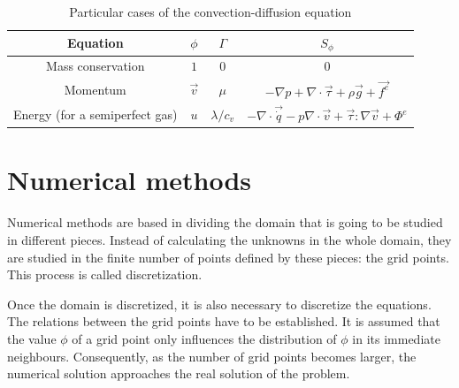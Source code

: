 \begin{table}[h!]
	\centering
	\begin{tabular}{ |c|c|c|c| } 
		\hline
		Equation & $\phi$ & $\Gamma$ & $S_{\phi}$ \\ \hline 
		Mass conservation & $1$ & $0$ & $0$ \\  \hline
		Momentum & $\vec{v}$ & $\mu$ & $-\nabla p+\nabla\cdot\vec{\tau}+\rho\vec{g}+\vec{f^{e}}$ \\  \hline
		Energy (for a semiperfect gas) & $u$ & $\lambda/c_{v}$ & $-\nabla\cdot\vec{\dot{q}}-p\nabla\cdot\vec{v}+\vec{\tau}:\nabla\vec{v}+\Phi^{e}$ \\
		\hline
	\end{tabular}
\caption{Particular cases of the convection-diffusion equation}
\label{convdifeq}
\end{table}

\section{Numerical methods}
Numerical methods are based in dividing the domain that is going to be studied in different pieces. Instead of calculating the unknowns in the whole domain, they are studied in the finite number of points defined by these pieces: the grid points. This process is called discretization.

Once the domain is discretized, it is also necessary to discretize the equations. The relations between the grid points have to be established. It is assumed that the value $\phi$ of a grid point only influences the distribution of $\phi$ in its immediate neighbours. Consequently, as the number of grid points becomes larger, the numerical solution approaches the real solution of the problem.

